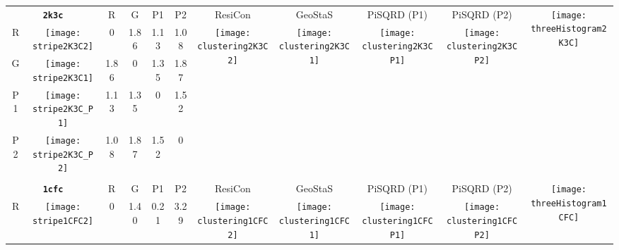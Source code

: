 \documentclass[a4paper,11pt,twoside]{book}%
\begin{document}
\begin{appendices}
\begin{sidewaystable}[h!]
\sffamily
\begin{tabular*}{4cm}{cc|c|c|c|c|c|c|c|c|c|}
\cline{1-11}
\multicolumn{2}{|c|}{{\bf \texttt{2k3c}}} & R & G & P1 & P2 & ResiCon & GeoStaS & PiSQRD (P1) & PiSQRD (P2) & \multirow{5}{*}{\vspace{-0.15cm}\texttt{[image: threeHistogram2K3C]}}  \\
\cline{1-10}
\multicolumn{1}{|c|}{R} & \texttt{[image: stripe2K3C2]} & 0 & 1.86 & 1.13 & 1.08 & \multirow{4}{*}{\vspace{-0.3cm}\texttt{[image: clustering2K3C2]}} & \multirow{4}{*}{\vspace{-0.3cm}\texttt{[image: clustering2K3C1]}} & \multirow{4}{*}{\vspace{-0.3cm}\texttt{[image: clustering2K3CP1]}} & \multirow{4}{*}{\vspace{-0.3cm}\texttt{[image: clustering2K3CP2]}} &  \multirow{5}{*}{} \\
\cline{1-6}
\multicolumn{1}{|c|}{G} & \texttt{[image: stripe2K3C1]} & 1.86 & 0 & 1.35 & 1.87 & \multirow{4}{*}{} & \multirow{4}{*}{} & \multirow{4}{*}{} & \multirow{4}{*}{} & \multirow{5}{*}{} \\
\cline{1-6}
\multicolumn{1}{|c|}{P1} & \texttt{[image: stripe2K3C\_P1]} & 1.13 & 1.35 & 0 & 1.52 & \multirow{4}{*}{} & \multirow{4}{*}{} & \multirow{4}{*}{} & \multirow{4}{*}{} & \multirow{5}{*}{}  \\
\cline{1-6}
\multicolumn{1}{|c|}{P2} & \texttt{[image: stripe2K3C\_P2]} & 1.08 & 1.87 & 1.52 & 0 & \multirow{4}{*}{} & \multirow{4}{*}{} & \multirow{4}{*}{} & \multirow{4}{*}{} & \multirow{5}{*}{}  \\
\cline{1-11}
\\
\cline{1-11}
\multicolumn{2}{|c|}{{\bf \texttt{1cfc}}} & R & G & P1 & P2 & ResiCon & GeoStaS & PiSQRD (P1) & PiSQRD (P2) & \multirow{5}{*}{\vspace{-0.15cm}\texttt{[image: threeHistogram1CFC]}}  \\
\cline{1-10}
\multicolumn{1}{|c|}{R} & \texttt{[image: stripe1CFC2]} & 0 & 1.40 & 0.21 & 3.29 & \multirow{4}{*}{\vspace{-0.3cm}\texttt{[image: clustering1CFC2]}} & \multirow{4}{*}{\vspace{-0.3cm}\texttt{[image: clustering1CFC1]}} & \multirow{4}{*}{\vspace{-0.3cm}\texttt{[image: clustering1CFCP1]}} & \multirow{4}{*}{\vspace{-0.3cm}\texttt{[image: clustering1CFCP2]}} &  \multirow{5}{*}{} \\

\end{tabular*}
\end{sidewaystable}
\end{appendices}
\end{document}
